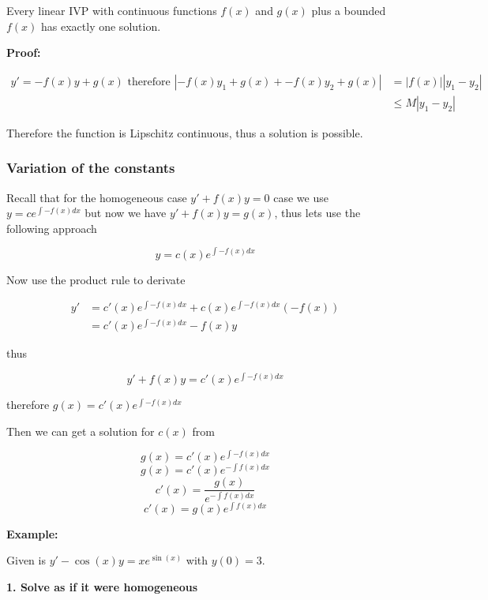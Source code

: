 Every linear IVP with continuous functions \(f(x)\) and \(g(x)\) plus a bounded \(f(x)\) 
has exactly one solution.
\vspace{\baselineskip}

\textbf{Proof:}

\begin{align*}
y' = -f(x)y + g(x) \text{ therefore } |-f(x)y_1 + g(x) + -f(x)y_2 + g(x) | &= |f(x)||y_1 - y_2|\\
                                                                        &\le M |y_1 - y_2|
\end{align*}

Therefore the function is Lipschitz continuous, thus a solution is possible.
\QED


\subsubsection{Variation of the constants}

Recall that for the homogeneous case \(y' + f(x)y = 0\) case we use 
\(y = c e^{\int -f(x) dx}\) but now we have \(y' + f(x)y = g(x)\), thus lets use the following
approach

\[y = c(x) e^{\int -f(x) dx}\]

Now use the product rule to derivate

\begin{align*}
y' &= c'(x) e^{\int -f(x) dx} + c(x)e^{\int -f(x) dx}(-f(x))\\
   &= c'(x)e^{\int -f(x) dx} - f(x)y
\end{align*}

thus 

\[y' + f(x)y = c'(x)e^{\int -f(x) dx}\]

therefore \(g(x) = c'(x)e^{\int -f(x) dx}\)
\vspace{\baselineskip}

Then we can get a solution for \(c(x)\) from

\[
g(x) = c'(x)e^{\int -f(x) dx}
\]
\[
g(x) = c'(x)e^{-\int f(x) dx}
\]
\[
c'(x) = \frac{g(x)}{e^{-\int f(x) dx}}
\]
\[
    c'(x) = g(x)e^{\int f(x) dx}
\]

\textbf{Example: }
\vspace{\baselineskip}

Given is \(y' -\cos(x)y = x e^{\sin(x)}\) with \(y(0) = 3\).
\vspace{\baselineskip}

\textbf{1. Solve as if it were homogeneous}

